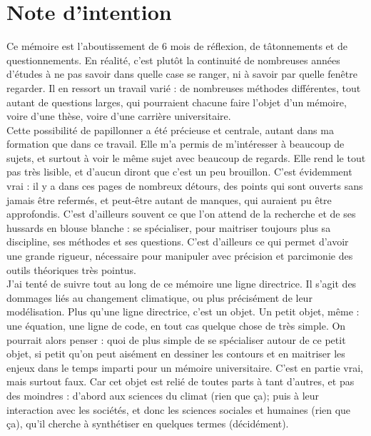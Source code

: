 \chapter*{Note d'intention}

Ce mémoire est l'aboutissement de 6 mois de réflexion, de tâtonnements et de questionnements. En réalité, c'est plutôt la continuité de nombreuses années d'études à ne pas savoir dans quelle case se ranger, ni à savoir par quelle fenêtre regarder. Il en ressort un travail varié : de nombreuses méthodes différentes, tout autant de questions larges, qui pourraient chacune faire l'objet d'un mémoire, voire d'une thèse, voire d'une carrière universitaire. \\

Cette possibilité de papillonner a été précieuse et centrale, autant dans ma formation que dans ce travail. Elle m'a permis de m'intéresser à beaucoup de sujets, et surtout à voir le même sujet avec beaucoup de regards. Elle rend le tout pas très lisible, et d'aucun diront que c'est un peu brouillon. C'est évidemment vrai : il y a dans ces pages de nombreux détours, des points qui sont ouverts sans jamais être refermés, et peut-être autant de manques, qui auraient pu être approfondis. C'est d'ailleurs souvent ce que l'on attend de la recherche et de ses hussards en blouse blanche : se spécialiser, pour maitriser toujours plus sa discipline, ses méthodes et ses questions. C'est d'ailleurs ce qui permet d'avoir une grande rigueur, nécessaire pour manipuler avec précision et parcimonie des outils théoriques très pointus. \\

J'ai tenté de suivre tout au long de ce mémoire une ligne directrice. Il s'agit des dommages liés au changement climatique, ou plus précisément de leur modélisation. Plus qu'une ligne directrice, c'est un objet. Un petit objet, même : une équation, une ligne de code, en tout cas quelque chose de très simple. On pourrait alors penser : quoi de plus simple de se spécialiser autour de ce petit objet, si petit qu'on peut aisément en dessiner les contours et en maitriser les enjeux dans le temps imparti pour un mémoire universitaire. C'est en partie vrai, mais surtout faux. Car cet objet est relié de toutes parts à tant d'autres, et pas des moindres : d'abord aux sciences du climat (rien que ça); puis à leur interaction avec les sociétés, et donc les sciences sociales et humaines (rien que ça), qu'il cherche à synthétiser en quelques termes (décidément). \\

